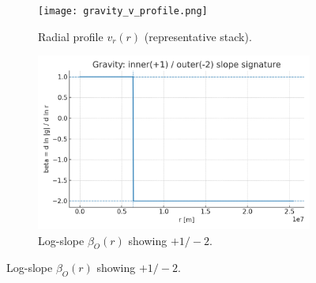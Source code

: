 \documentclass[12pt,a4paper,oneside]{scrreprt}
\begin{document}
\begin{figure}[htbp]\centering
  \begin{subfigure}[t]{0.49\linewidth}
    \texttt{[image: gravity\_v\_profile.png]}
    \caption{Radial profile $v_r(r)$ (representative stack).}
    \label{fig:grav:vr}
  \end{subfigure}\hfill
  \begin{subfigure}[t]{0.49\linewidth}
    \includegraphics[width=\linewidth]{gravity_beta_signature.png}
    \caption{Log-slope $\beta_O(r)$ showing $+1/-2$.}
    \label{fig:grav:beta}
  \end{subfigure}


\end{figure}
\end{document}
